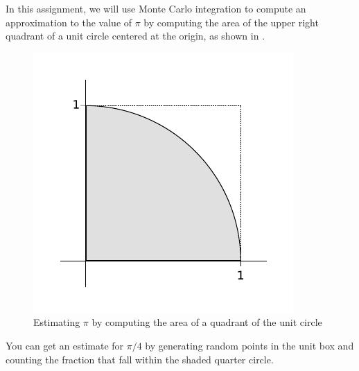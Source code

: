 \documentclass[12pt,answers]{exam}
\begin{document}
\pagestyle{headandfoot}
\runningfootrule
{}
\runningheader{}{}{}
\firstpagefooter{}{}{}


\def\Li{\mbox{\rm Li}_{2}}
\def\dilog{\mbox{\tt dilog}}

In this assignment, we will use Monte Carlo integration to compute an approximation to the
value of $\pi$ by computing the area of the upper right quadrant of a unit circle centered at
the origin, as shown in .
%
\begin{figure}[h]
\centering
\includegraphics[scale=.75]{pie.pdf}
\caption{Estimating $\pi$ by computing the area of a quadrant of the unit circle
  \label{fig:pie}}
\end{figure}
%

You can get an estimate for $\pi/4$ by generating random points in the unit box and counting
the fraction that fall within the shaded quarter circle.
\end{document}

